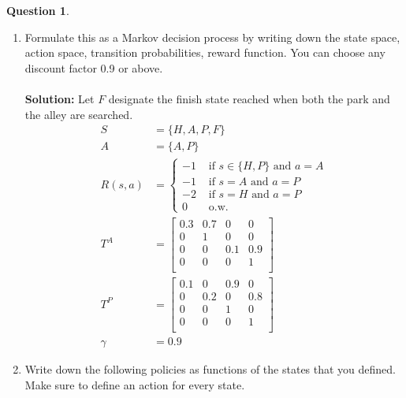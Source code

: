 \documentclass{article}
\theoremstyle{definition}
\newtheorem{question}[thm]{Question}
\begin{document}
\begin{question}
    \begin{enumerate}[label=\alph*)]
        \item Formulate this as a Markov decision process by writing down the state space, action space, transition probabilities, reward function. You can choose any discount factor 0.9 or above.
         \\ \\
        \noindent \textbf{Solution: }
        Let $F$ designate the finish state reached when both the park and the alley are searched.
        \begin{align*}
            S &= \{H,A,P,F\} \\
            A &= \{A,P\}\\
            R(s,a) &= 
            \begin{cases}
                -1& \text{ if } s\in\{H,P\}\text{ and } a = A\\
                -1& \text{ if } s = A\text{ and } a = P\\
                -2& \text{ if } s = H\text{ and } a = P\\
                0 & \text{ o.w.}
            \end{cases}\\
            T^A &= \begin{bmatrix}
                            0.3 & 0.7 & 0 & 0\\
                            0 & 1 & 0 & 0\\
                            0 & 0 & 0.1 & 0.9\\
                            0 & 0 & 0 & 1\\
                         \end{bmatrix}\\
             T^P &= \begin{bmatrix}
                            0.1 & 0 & 0.9 & 0\\
                            0 & 0.2 & 0 & 0.8\\
                            0 & 0 & 1 & 0\\
                            0 & 0 & 0 & 1\\
                         \end{bmatrix}\\
             \gamma &= 0.9
        \end{align*}
        \item Write down the following policies as functions of the states that you defined. Make sure to define an action for every state.

\end{enumerate}
\end{question}
\end{document}
